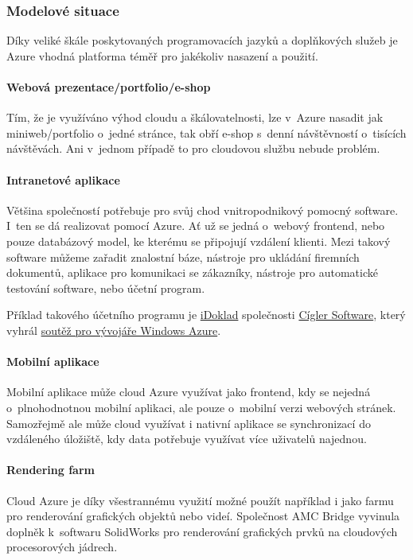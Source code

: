 \subsubsection{Modelové situace}
Díky veliké škále poskytovaných programovacích jazyků a doplňkových služeb je Azure vhodná platforma téměř pro jakékoliv nasazení a použití.

\paragraph{Webová prezentace/portfolio/e-shop}
Tím, že je využíváno výhod cloudu a škálovatelnosti, lze v~Azure nasadit jak miniweb/portfolio o~jedné stránce, tak obří e-shop s~denní návštěvností o~tisících návštěvách. Ani v~jednom případě to pro cloudovou službu nebude problém.

\paragraph{Intranetové aplikace}
Většina společností potřebuje pro svůj chod vnitropodnikový pomocný software. I~ten se dá realizovat pomocí Azure. Ať už se jedná o~webový frontend, nebo pouze databázový model, ke kterému se připojují vzdálení klienti. Mezi takový software můžeme zařadit znalostní báze, nástroje pro ukládání firemních dokumentů, aplikace pro komunikaci se zákazníky, nástroje pro automatické testování software, nebo účetní program.

Příklad takového účetního programu je \href{https://www.idoklad.cz}{iDoklad} společnosti \href{http://www.money.cz/}{Cígler Software}, který vyhrál \href{http://startup.lupa.cz/clanky/pate-kolo-souteze-pro-vyvojare-windows-azure-vyhrala-aplikace-idoklad/}{soutěž pro vývojáře Windows Azure\cite{lupa:iDoklad}}.

\paragraph{Mobilní aplikace}
Mobilní aplikace může cloud Azure využívat jako frontend, kdy se nejedná o~plnohodnotnou mobilní aplikaci, ale pouze o~mobilní verzi webových stránek. Samozřejmě ale může cloud využívat i nativní aplikace se synchronizací do vzdáleného úložiště, kdy data potřebuje využívat více uživatelů najednou.

\paragraph{Rendering farm}
Cloud Azure je díky všestrannému využití možné použít například i jako farmu pro renderování grafických objektů nebo videí. Společnost AMC Bridge vyvinula doplněk k~softwaru SolidWorks pro renderování grafických prvků na cloudových procesorových jádrech.\cite{amcbridge:cloudRender}

